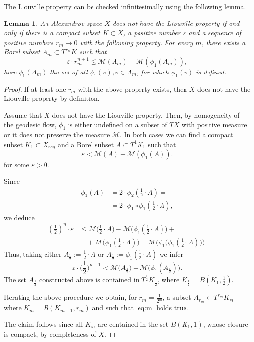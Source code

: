 \documentclass[12pt,leqno,intlimits]{amsart}
\numberwithin{equation}{section}
\newtheorem{lem}[thm]{Lemma}
\theoremstyle{definition}
\theoremstyle{remark}
\begin{document}
The Liouville property can be checked infinitesimally using the following lemma.

\begin{lem} \label{infini}
An Alexandrov space $X$ \emph{does not} have the Liouville property if and only if there is a compact subset $K\subset X$, a positive number
$\varepsilon$ and a sequence of positive numbers $r_m \to 0$ with the following property.
For every $m$, there exists a Borel subset $A_m\subset T^{r_ m} K$ such that
\begin{equation} \label{eq:m}
\varepsilon \cdot r_m^{n +1} \leq \mathcal M (A_m) -\mathcal M (\phi _1 (A_m)),
\end{equation}
here $\phi_1 (A_m)$ the set of all $\phi _1(v), v\in A_m$, for which
$\phi _1(v)$ is defined.
\end{lem}

\begin{proof}
If at least one $r_m$ with the above property exists, then $X$ does not have the Liouville property by definition.

{\color{red}

Assume that $X$ does not have the Liouville property.
Then, by homogeneity of the geodesic flow, $\phi _1$ is either undefined  on a subset of $TX$ with positive measure
or it does not preserve the measure $\mathcal M$.
In both cases we can find a compact subset $K_1\subset X_{reg}$ and a Borel subset $A\subset T^1 K_1$ such that
\[\varepsilon < \mathcal M (A) - \mathcal M(\phi_1 (A)).\]
for some $\varepsilon >0$.

}

Since
\begin{align*}
\phi_1 (A)&=2\cdot \phi _2 (\tfrac 1 2 \cdot A )=
\\
&=2\cdot \phi _1 \circ \phi_1 (\tfrac 1 2\cdot  A ) ,
\end{align*}
we deduce
\begin{align*}
(\tfrac 1 2)^n \cdot \varepsilon &\leq \mathcal M \big(\tfrac 1 2\cdot A \big) - \mathcal M \big( \phi_1 (\tfrac 1 2\cdot A ) \big) +
\\
&\quad+\mathcal M \big(\phi_1 (\tfrac 1 2\cdot A )\big)
- \mathcal M\big (\phi_1 \big (\phi _1 (\tfrac 1 2\cdot A )\big) \big).
\end{align*}
Thus, taking either $A_{\frac 1 2} := \frac 1 2 \cdot A$ or $A_{\frac 1 2} := \phi_1 (\frac 1 2 \cdot A)$ we infer
$$\varepsilon \cdot \Big(\frac 1 2 \Big )^{n+1} < \mathcal M \big(A _{\frac 1 2} \big) - \mathcal M \big( \phi_1 (A _{\frac 1 2}) \big).$$
The set $A_{\frac 1 2}$ constructed above is contained in $T^{\frac 1 2} K_{\frac 1 2}$, where $K _{\frac 1 2} =B (K_1,{\frac 1 2})$.

Iterating the above procedure we obtain, for $r_m =\frac 1 {2^m}$, a subset $A_{r_m} \subset T^{r_m} K_m$ where $K_m =B (K_{m-1},{r_m})$ and such that \eqref{eq:m} holds true.

The claim follows since all $K_m$ are contained in the set $B (K_1,1)$, whose closure is compact, by completeness of $X$.
\end{proof}
\end{document}
